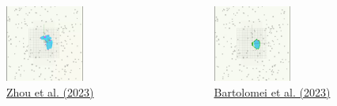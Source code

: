 \documentclass[
  24pt, %
  aspectratio=169, %
]{beamer}
\begin{document}
\begin{frame}
  \begin{columns}
    \begin{column}{.5\textwidth}
      \begin{figure}
        \centering
        \includegraphics[width=0.6\textwidth]{racer}\\
        \href{run:./OrbiteEul.gif}{Zhou et al. (2023)}
      \end{figure}
    \end{column}
    \begin{column}{.5\textwidth}
      \begin{figure}
        \centering
        \includegraphics[width=0.6\textwidth]{fame}\\
        \href{run:Images/fame_x10.webm}{Bartolomei et al. (2023)}
      \end{figure}
    \end{column}
  \end{columns}
\end{frame}
\end{document}
